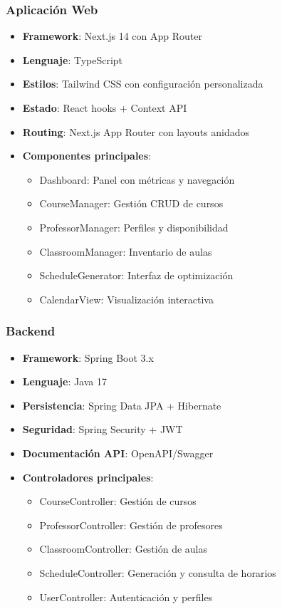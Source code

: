 \subsubsection{Aplicación Web}
\begin{itemize}
\item \textbf{Framework}: Next.js 14 con App Router
\item \textbf{Lenguaje}: TypeScript
\item \textbf{Estilos}: Tailwind CSS con configuración personalizada
\item \textbf{Estado}: React hooks + Context API
\item \textbf{Routing}: Next.js App Router con layouts anidados
\item \textbf{Componentes principales}:
  \begin{itemize}
  \item Dashboard: Panel con métricas y navegación
  \item CourseManager: Gestión CRUD de cursos
  \item ProfessorManager: Perfiles y disponibilidad
  \item ClassroomManager: Inventario de aulas
  \item ScheduleGenerator: Interfaz de optimización
  \item CalendarView: Visualización interactiva
  \end{itemize}
\end{itemize}

\subsubsection{Backend}
\begin{itemize}
\item \textbf{Framework}: Spring Boot 3.x
\item \textbf{Lenguaje}: Java 17
\item \textbf{Persistencia}: Spring Data JPA + Hibernate
\item \textbf{Seguridad}: Spring Security + JWT
\item \textbf{Documentación API}: OpenAPI/Swagger
\item \textbf{Controladores principales}:
  \begin{itemize}
  \item CourseController: Gestión de cursos
  \item ProfessorController: Gestión de profesores
  \item ClassroomController: Gestión de aulas
  \item ScheduleController: Generación y consulta de horarios
  \item UserController: Autenticación y perfiles
  \end{itemize}
\end{itemize}

